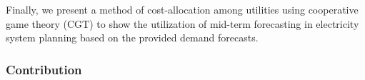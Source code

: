 \documentclass[journal]{IEEEtran} %
\begin{document}
Finally, we present a method of cost-allocation among utilities using cooperative game theory (CGT) to show the utilization of mid-term forecasting in electricity system planning based on the provided demand forecasts.
 










\subsubsection{Contribution}
\end{document}
